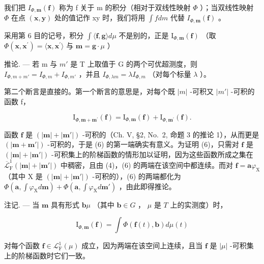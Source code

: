 我们把 \(I_{\Phi,\mathbf{m}}(\mathbf{f})\) 称为 f 关于 m 的积分（相对于双线性映射 \(\Phi\) ）；当双线性映射 \(\Phi\) 在点 \((\mathbf{x},\mathbf{y})\) 处的值记作 xy 时，我们将用 \(\int f dm\) 代替 \(I_{\Phi,\mathbf{m}}(\mathbf{f})\) 。

采用第 6 目的记号，积分 \(\int \langle \mathbf{f},\mathbf{g}\rangle d\mu\) 不是别的，正是 \(\mathrm{I}_{\Phi ,\mathbf{m}}(\mathbf{f})\) （取 \(\Phi (\mathbf{x},\mathbf{x}^{\prime}) = \langle \mathbf{x},\mathbf{x}^{\prime}\rangle\) 与 \(\mathbf{m} = \mathbf{g}\cdot \mu\) ）

推论. --- 若 m 与 \(m'\) 是 T 上取值于 G 的两个可优超测度，则 \(I_{\Phi,m+m'} = I_{\Phi,m} + I_{\Phi,m'}\) ，并且 \(I_{\Phi,\lambda m} = \lambda I_{\Phi,m}\) （对每个标量 \(\lambda\) ）。

第二个断言是直接的。第一个断言的意思是，对每个既 \(|m|\) -可积又 \(|m'|\) -可积的函数 f，

\[
\mathrm{I} _ {\Phi , \mathbf {m} + \mathbf {m} ^ {\prime}} (\mathbf {f}) = \mathrm{I} _ {\Phi , \mathbf {m}} (\mathbf {f}) + \mathrm{I} _ {\Phi , \mathbf {m} ^ {\prime}} (\mathbf {f}).\tag{6}
\]

函数 \(\mathbf{f}\) 是 \((|\mathbf{m}| + |\mathbf{m}'|)\) -可积的（Ch. V, §2, No.~2, 命题 3 的推论 1），从而更是 \((|\mathbf{m} + \mathbf{m}'|)\) -可积的，于是 (6) 的第一端确实有意义。为证明 (6)，只需对 \(\mathbf{f}\) 是 \((|\mathbf{m}| + |\mathbf{m}'|)\) -可积集上的阶梯函数的情形加以证明，因为这些函数所成之集在 \(\overline{\mathcal{L}}_{\mathrm{F}}^{1}(|\mathbf{m}| + |\mathbf{m}'|)\) 中稠密，且由 (4)，(6) 的两端在该空间中都连续。而对 \(\mathbf{f} = \mathbf{a}\varphi_{\mathrm{X}}\) （其中 \(\mathrm{X}\) 是 \((|\mathbf{m}| + |\mathbf{m}'|)\) -可积的），(6) 的两端都化为 \(\Phi(\mathbf{a}, \int \varphi_{\mathrm{X}} d\mathbf{m}) + \Phi(\mathbf{a}, \int \varphi_{\mathrm{X}} d\mathbf{m}')\) ，由此即得推论。

注记. --- 当 \(\mathbf{m}\) 具有形式 \(\mathbf{b}\mu\) （其中 \(\mathbf{b} \in G\) ， \(\mu\) 是 \(T\) 上的实测度）时，

\[
\mathrm{I} _ {\Phi , \mathbf {m}} (\mathbf {f}) = \int \Phi (\mathbf {f} (t), \mathbf {b}) d \mu (t)
\]

对每个函数 \(\mathbf{f} \in \mathcal{L}_{\mathrm{F}}^{1}(\mu)\) 成立，因为两端在该空间上连续，且当 \(\mathbf{f}\) 是 \(|\mu|\) -可积集上的阶梯函数时它们一致。

